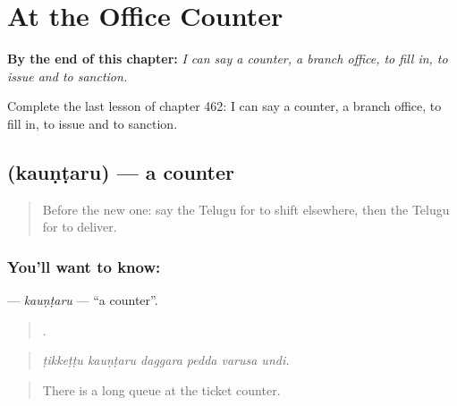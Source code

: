 
\chapter{At the Office Counter}
\label{ch:te-at-the-office-counter}

\begin{chapteropening}
\textbf{By the end of this chapter:} \emph{I can say a counter, a branch office, to fill in, to issue and to sanction.}

Complete the last lesson of chapter 462: I can say a counter, a branch office, to fill in, to issue and to sanction.
\end{chapteropening}

\section[\texorpdfstring{\te{కౌంటరు} (kauṇṭaru)}{కౌంటరు (kauṇṭaru)}]{ (kauṇṭaru) — a counter}

\label{lesson:TE-C462-kauntaru}



\begin{quote}
Before the new one: say the Telugu for to shift elsewhere, then the Telugu for to deliver.
\end{quote}

\subsection*{You'll want to know: }
\textbf{} — \emph{kauṇṭaru} — \textquotedblleft{}a counter\textquotedblright{}.

\begin{quote}
     .
\end{quote}

\begin{quote}
\emph{ṭikkeṭṭu kauṇṭaru daggara pedda varusa undi.}
\end{quote}

\begin{quote}
There is a long queue at the ticket counter.
\end{quote}

